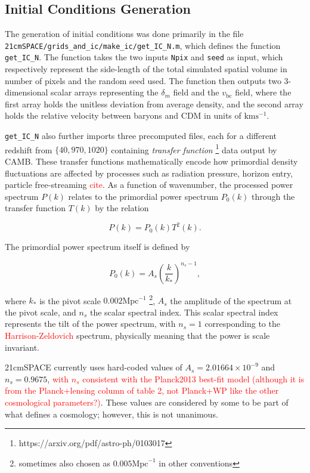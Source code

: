 \documentclass[floats,floatfix,showpacs,amssymb,prd,superscriptaddress,nofootinbib]{revtex4-2} %
\newcommand{\code}{\texttt}
\newcommand{\red}{\textcolor{red}}
\begin{document}
\subsection{Initial Conditions Generation}

The generation of initial conditions was done primarily in the file \code{21cmSPACE/grids\_and\_ic/make\_ic/get\_IC\_N.m}, which defines the function \code{get\_IC\_N}. The function takes the two inputs \code{Npix} and \code{seed} as input, which respectively represent the side-length of the total simulated spatial volume in number of pixels and the random seed used. The function then outputs two 3-dimensional scalar arrays representing the $\delta_m$ field and the $v_{\text{bc}}$ field, where the first array holds the unitless deviation from average density, and the second array holds the relative velocity between baryons and CDM in units of $\text{km} \text{s}^{-1}$. 

\code{get\_IC\_N} also further imports three precomputed files, each for a different redshift from $\{40, 970, 1020\}$ containing \textit{transfer function} \footnote{https://arxiv.org/pdf/astro-ph/0103017} data output by CAMB. These transfer functions mathematically encode how primordial density fluctuations are affected by processes such as radiation pressure, horizon entry, particle free-streaming \red{cite}. As a function of wavenumber, the processed power spectrum $P(k)$ relates to the primordial power spectrum $P_0 (k)$ through the transfer function $T(k)$ by the relation

\begin{equation}
    P(k) = P_0 (k) T^2 (k).
\end{equation}

\noindent The primordial power spectrum itself is defined by 

\begin{equation}
    P_0 (k) = A_s \left( \frac{k}{k_*} \right)^{n_s - 1},
\end{equation}

\noindent where $k_*$ is the pivot scale $0.002 \text{Mpc}^{-1}$ \footnote{sometimes also chosen as $0.005 \text{Mpc}^{-1}$ in other conventions}, $A_s$ the amplitude of the spectrum at the pivot scale, and $n_s$ the scalar spectral index. This scalar spectral index  represents the tilt of the power spectrum, with $n_s = 1$ corresponding to the \red{Harrison-Zeldovich} spectrum, physically meaning that the power is scale invariant. 

21cmSPACE currently uses hard-coded values of $A_s = 2.01664 \times 10^{-9}$ and $n_s = 0.9675$, \red{with $n_s$ consistent with the Planck2013 best-fit model (although it is from the Planck+lensing column of table 2, not Planck+WP like the other cosmological parameters?)}. These values are considered by some to be part of what defines a cosmology; however, this is not unanimous.
\end{document}
